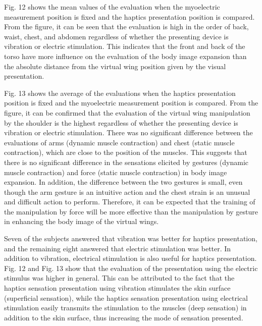 \documentclass[letterpaper, 10 pt, conference]{ieeeconf}  %
\begin{document}

                Fig. 12 shows the mean values of the evaluation when the myoelectric measurement position is fixed and the haptics presentation position is compared.
                From the figure, it can be seen that the evaluation is high in the order of back, waist, chest, and abdomen regardless of whether the presenting device is vibration or electric stimulation.
                This indicates that the front and back of the torso have more influence on the evaluation of the body image expansion than the absolute distance from the virtual wing position given by the visual presentation.

                Fig. 13 shows the average of the evaluations when the haptics presentation position is fixed and the myoelectric measurement position is compared.
                From the figure, it can be confirmed that the evaluation of the virtual wing manipulation by the shoulder is the highest regardless of whether the presenting device is vibration or electric stimulation. 
                There was no significant difference between the evaluations of arms (dynamic muscle contraction) and chest (static muscle contraction), which are close to the position of the muscles. 
                This suggests that there is no significant difference in the sensations elicited by gestures (dynamic muscle contraction) and force (static muscle contraction) in body image expansion. 
                In addition, the difference between the two gestures is small, even though the arm gesture is an intuitive action and the chest strain is an unusual and difficult action to perform. 
                Therefore, it can be expected that the training of the manipulation by force will be more effective than the manipulation by gesture in enhancing the body image of the virtual wings.

                Seven of the subjects answered that vibration was better for haptics presentation, and the remaining eight answered that electric stimulation was better. 
                In addition to vibration, electrical stimulation is also useful for haptics presentation. 
                Fig. 12 and Fig. 13 show that the evaluation of the presentation using the electric stimulus was higher in general. 
                This can be attributed to the fact that the haptics sensation presentation using vibration stimulates the skin surface (superficial sensation), while the haptics sensation presentation using electrical stimulation easily transmits the stimulation to the muscles (deep sensation) in addition to the skin surface, thus increasing the mode of sensation presented.
\end{document}
